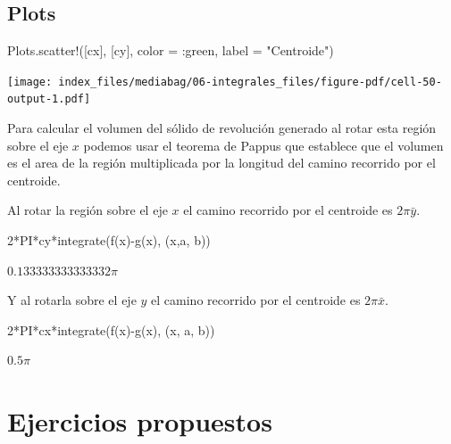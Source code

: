 \documentclass[
  a4paper,
]{scrreport}
\newenvironment{Shaded}{\begin{snugshade}}{\end{snugshade}}
\newcommand{\FloatTok}[1]{\textcolor[rgb]{0.68,0.00,0.00}{#1}}
\newcommand{\FunctionTok}[1]{\textcolor[rgb]{0.28,0.35,0.67}{#1}}
\newcommand{\NormalTok}[1]{\textcolor[rgb]{0.00,0.23,0.31}{#1}}
\newcommand{\OperatorTok}[1]{\textcolor[rgb]{0.37,0.37,0.37}{#1}}
\newcommand{\StringTok}[1]{\textcolor[rgb]{0.13,0.47,0.30}{#1}}
\theoremstyle{definition}
\theoremstyle{remark}
\begin{document}
\begin{tcolorbox}
\section{Plots}

\begin{Shaded}
\begin{Highlighting}[]
\NormalTok{Plots.}\FunctionTok{scatter!}\NormalTok{([cx], [cy], color }\OperatorTok{=} \OperatorTok{:}\NormalTok{green, label }\OperatorTok{=} \StringTok{"Centroide"}\NormalTok{)}
\end{Highlighting}
\end{Shaded}

\texttt{[image: index\_files/mediabag/06-integrales\_files/figure-pdf/cell-50-output-1.pdf]}

Para calcular el volumen del sólido de revolución generado al rotar esta
región sobre el eje \(x\) podemos usar el teorema de Pappus que
establece que el volumen es el area de la región multiplicada por la
longitud del camino recorrido por el centroide.

Al rotar la región sobre el eje \(x\) el camino recorrido por el
centroide es \(2\pi \bar y\).

\begin{Shaded}
\begin{Highlighting}[]
\FloatTok{2}\FunctionTok{*PI*cy*integrate}\NormalTok{(}\FunctionTok{f}\NormalTok{(x)}\FunctionTok{{-}g}\NormalTok{(x), (x,a, b))}
\end{Highlighting}
\end{Shaded}

$0.133333333333332 \pi$

Y al rotarla sobre el eje \(y\) el camino recorrido por el centroide es
\(2\pi \bar x\).

\begin{Shaded}
\begin{Highlighting}[]
\FloatTok{2}\FunctionTok{*PI*cx*integrate}\NormalTok{(}\FunctionTok{f}\NormalTok{(x)}\FunctionTok{{-}g}\NormalTok{(x), (x, a, b))}
\end{Highlighting}
\end{Shaded}

$0.5 \pi$

\end{tcolorbox}

\section{Ejercicios propuestos}\label{ejercicios-propuestos-4}
\end{document}
